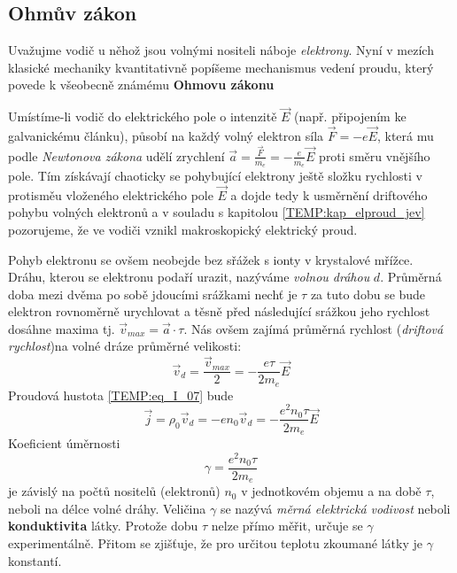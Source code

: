     \subsection{Ohmův zákon}
      Uvažujme vodič u něhož jsou volnými nositeli náboje \emph{elektrony}. Nyní v mezích klasické
      mechaniky kvantitativně popíšeme mechanismus vedení proudu, který povede k všeobecně známému
      \textbf{Ohmovu zákonu}
      
      Umístíme-li vodič do elektrického pole o intenzitě $\vec{E}$ (např. připojením ke
      galvanickému článku), působí na každý volný elektron síla $\vec{F} = -e\vec{E}$, která mu
      podle \emph{Newtonova zákona} udělí zrychlení $\vec{a} = \frac{\vec{F}}{m_e} = -
      \frac{e}{m_e}\vec{E}$ proti směru vnějšího pole. Tím získávají chaoticky se pohybující
      elektrony ještě složku rychlosti v protisměu vloženého elektrického pole $\vec{E}$ a  dojde
      tedy k usměrnění driftového pohybu volných elektronů a v souladu s kapitolou
      \ref{TEMP:kap_elproud_jev} pozorujeme, že ve vodiči vznikl makroskopický elektrický proud.
      
      Pohyb elektronu se ovšem neobejde bez sřážek s ionty v krystalové mřížce. Dráhu, kterou se
      elektronu podaří urazit, nazýváme \emph{volnou dráhou} $d$. Průměrná doba mezi dvěma po sobě
      jdoucími srážkami nechť je $\tau$ za tuto dobu se bude elektron rovnoměrně urychlovat a těsně
      před následující srážkou jeho rychlost dosáhne maxima tj. $\vec{v}_{max} = \vec{a}\cdot\tau$.
      Nás ovšem zajímá průměrná rychlost (\emph{driftová rychlost})na volné dráze průměrné
      velikosti:
      \begin{equation}\label{TEMP:eq_vd_01}
        \vec{v}_d = \frac{\vec{v}_{max}}{2} = -\frac{e\tau}{2m_e}\vec{E}
      \end{equation}   
      Proudová hustota \ref{TEMP:eq_I_07} bude
      \begin{equation}\label{TEMP:eq_j_02}
        \vec{j} = \rho_0\vec{v}_d= -en_0\vec{v}_d = -\frac{e^2n_0\tau}{2m_e}\vec{E}
      \end{equation}       
      Koeficient úměrnosti 
      \begin{equation}\label{TEMP:eq_g_03}
        \gamma = \frac{e^2n_0\tau}{2m_e}
      \end{equation}     
      je závislý na počtů nositelů (elektronů) $n_0$ v jednotkovém objemu a na době $\tau$, neboli
      na délce volné dráhy. Veličina $\gamma$ se nazývá \emph{měrná elektrická vodivost} neboli
      \textbf{konduktivita} látky. Protože dobu $\tau$ nelze přímo měřit, určuje se $\gamma$
      experimentálně. Přitom se zjišťuje, že pro určitou teplotu zkoumané látky je $\gamma$
      konstantí.
      
